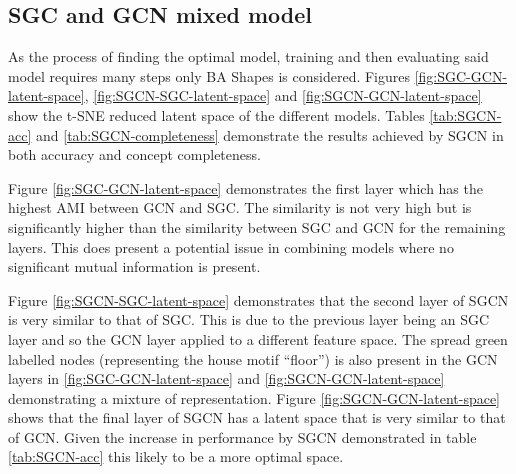 \subsection{SGC and GCN mixed model}
\label{sec:SGCN}



As the process of finding the optimal model, training and then evaluating said model requires many steps only BA Shapes is considered.
Figures \ref{fig:SGC-GCN-latent-space}, \ref{fig:SGCN-SGC-latent-space} and \ref{fig:SGCN-GCN-latent-space} show the t-SNE reduced latent space of the different models.
Tables \ref{tab:SGCN-acc} and \ref{tab:SGCN-completeness} demonstrate the results achieved by SGCN in both accuracy and concept completeness.

Figure \ref{fig:SGC-GCN-latent-space} demonstrates the first layer which has the highest AMI between GCN and SGC.
The similarity is not very high but is significantly higher than the similarity between SGC and GCN for the remaining layers.
This does present a potential issue in combining models where no significant mutual information is present.

Figure \ref{fig:SGCN-SGC-latent-space} demonstrates that the second layer of SGCN is very similar to that of SGC.
This is due to the previous layer being an SGC layer and so the GCN layer applied to a different feature space.
The spread green labelled nodes (representing the house motif ``floor'') is also present in the GCN layers in \ref{fig:SGC-GCN-latent-space} and \ref{fig:SGCN-GCN-latent-space} demonstrating a mixture of representation.
Figure \ref{fig:SGCN-GCN-latent-space} shows that the final layer of SGCN has a latent space that is very similar to that of GCN.
Given the increase in performance by SGCN demonstrated in table \ref{tab:SGCN-acc} this likely to be a more optimal space.

